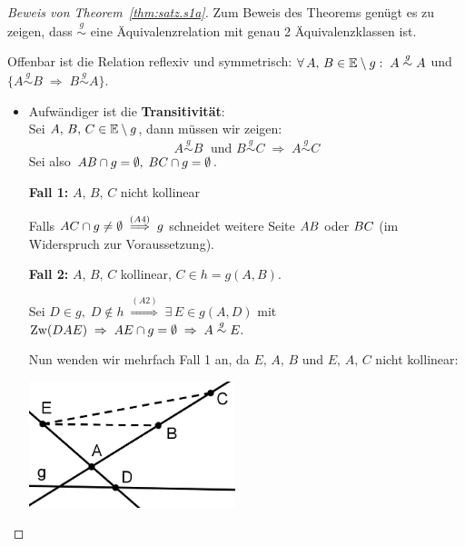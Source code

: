 \begin{proof}[Beweis von Theorem~\ref{thm:satz.s1a}]
Zum Beweis des Theorems genügt es zu zeigen, dass $\stackrel{g}{\sim}$
eine \"{A}quivalenzrelation mit genau 2 \"{A}quivalenzklassen ist.


Offenbar ist die Relation reflexiv und symmetrisch:
$\forall\,A,\,B\in\mathbb E\setminus g:\;A\stackrel{g}{\sim} A$
und $\{A\stackrel{g}{\sim} B\;\Rightarrow\;B\stackrel{g}{\sim}
A\}$.

\begin{itemize}
\item
Aufw\"{a}ndiger ist die {\bf Transitivit\"{a}t}:\\
Sei
$A,\,B,\,C\in\mathbb E\setminus g$, dann m\"{u}ssen wir zeigen:
\[
A\stackrel{g}{\sim} B\;\mbox{ und } B\stackrel{g}{\sim}
C\;\Rightarrow\;A\stackrel{g}{\sim} C
\] 
Sei also ${AB}\cap
g=\emptyset,\;{BC}\cap g=\emptyset$.


    {\bf Fall 1:} $A,\,B,\,C$ nicht kollinear

    Falls ${AC}\cap g\neq\emptyset\;\stackrel{(A4)}{\Longrightarrow}\;g$ schneidet
    weitere Seite ${AB}$ oder ${BC}$ (im Widerspruch zur Voraussetzung). 



    {\bf Fall 2:} $A,\,B,\,C$ kollinear, $C\in h=g(A,B)$.



    Sei $D\in g,\;D\notin h\;\stackrel{(A2)}{\Longrightarrow}\;
    \exists\,E\in g(A,D)$ mit $\operatorname{Zw}(DAE)\;\Rightarrow\;
    {AE}\cap g=\emptyset\;\Rightarrow\;A\stackrel{g}{\sim} E.$

    Nun wenden wir mehrfach Fall 1 an, da  $E,\,A,\,B$ und  $E,\,A,\,C$ nicht
    kollinear:


\centerline{\includegraphics[width=6cm]{BILDER/1-1-06c-Seiten.png}}



\end{itemize}
\end{proof}
